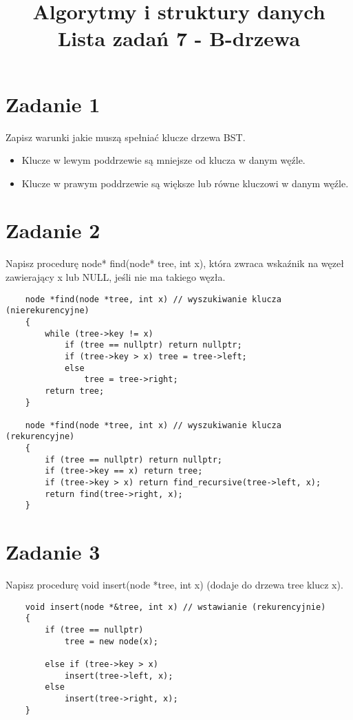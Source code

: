 \documentclass{article}
\title {
    \Huge\textbf{Algorytmy i struktury danych} \\
    \vspace{2mm}
    \huge{Lista zadań 7 - B-drzewa} 
    \date{}
}
\begin{document}
    \maketitle
    \boldmath
    \section*{Zadanie 1}
        Zapisz warunki jakie muszą spełniać klucze drzewa BST.
        \begin{itemize}
            \item Klucze w lewym poddrzewie są mniejsze od klucza w danym węźle.
            \item Klucze w prawym poddrzewie są większe lub równe kluczowi w danym węźle.
        \end{itemize}

    \section*{Zadanie 2}
    Napisz procedurę node* find(node* tree, int x), która zwraca wskaźnik na węzeł 
    zawierający x lub NULL, jeśli nie ma takiego węzła.
    \begin{lstlisting}
    node *find(node *tree, int x) // wyszukiwanie klucza (nierekurencyjne)
    {
        while (tree->key != x)
            if (tree == nullptr) return nullptr;
            if (tree->key > x) tree = tree->left;	 
            else				 
                tree = tree->right;	 
        return tree;
    }

    node *find(node *tree, int x) // wyszukiwanie klucza (rekurencyjne)
    {   
        if (tree == nullptr) return nullptr;
        if (tree->key == x) return tree;		   
        if (tree->key > x) return find_recursive(tree->left, x);										
        return find(tree->right, x); 
    }
    \end{lstlisting}

    \section*{Zadanie 3}
    Napisz procedurę void insert(node *tree, int x) (dodaje do drzewa tree klucz x).
    \begin{lstlisting}
    void insert(node *&tree, int x) // wstawianie (rekurencyjnie)
    {
        if (tree == nullptr)	 
            tree = new node(x); 

        else if (tree->key > x)			   
            insert(tree->left, x);  
        else							   
            insert(tree->right, x); 
    }
    \end{lstlisting}
\end{document}

